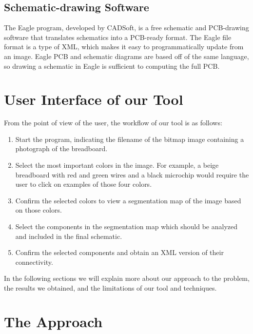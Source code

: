 \documentclass[10pt,twocolumn,letterpaper]{article}
\begin{document}
\subsection{Schematic-drawing Software}

The Eagle program, developed by CADSoft, is a free schematic and PCB-drawing
software that translates schematics into a PCB-ready format. The Eagle file
format is a type of XML, which makes it easy to programmatically update from an
image. Eagle PCB and schematic diagrams are based off of the same language, so
drawing a schematic in Eagle is sufficient to computing the full PCB. 


\section{User Interface of our Tool}

From the point of view of the user, the workflow of our tool is as
follows:

\begin{enumerate}
\item Start the program, indicating the filename of the bitmap image
  containing a photograph of the breadboard.
\item Select the most important colors in the image. For example, a
  beige breadboard with red and green wires and a black microchip
  would require the user to click on examples of those four colors.
\item Confirm the selected colors to view a segmentation map of the image
  based on those colors.
\item Select the components in the segmentation map which should be
  analyzed and included in the final schematic.
\item Confirm the selected components and obtain an XML version of
  their connectivity.
\end{enumerate}

In the following sections we will explain more about our approach to
the problem, the results we obtained, and the limitations of our tool
and techniques.

\section{The Approach}
\end{document}

